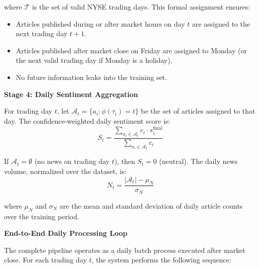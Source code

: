 \documentclass[12pt,a4paper]{article}
\begin{document}
where $\mathcal{T}$ is the set of valid NYSE trading days. This formal assignment ensures:
\begin{itemize}
    \item Articles published during or after market hours on day $t$ are assigned to the next trading day $t+1$.
    \item Articles published after market close on Friday are assigned to Monday (or the next valid trading day if Monday is a holiday).
    \item No future information leaks into the training set.
\end{itemize}

\textbf{Stage 4: Daily Sentiment Aggregation}

For trading day $t$, let $\mathcal{A}_t = \{a_i : \phi(\tau_i) = t\}$ be the set of articles assigned to that day. The confidence-weighted daily sentiment score is:
\begin{equation}
S_t = \frac{\sum_{a_i \in \mathcal{A}_t} c_i \cdot s_i^{\text{final}}}{\sum_{a_i \in \mathcal{A}_t} c_i}
\end{equation}

If $\mathcal{A}_t = \emptyset$ (no news on trading day $t$), then $S_t = 0$ (neutral). The daily news volume, normalized over the dataset, is:
\begin{equation}
N_t = \frac{|\mathcal{A}_t| - \mu_N}{\sigma_N}
\end{equation}

where $\mu_N$ and $\sigma_N$ are the mean and standard deviation of daily article counts over the training period.

\textbf{End-to-End Daily Processing Loop}

The complete pipeline operates as a daily batch process executed after market close. For each trading day $t$, the system performs the following sequence:
\end{document}
